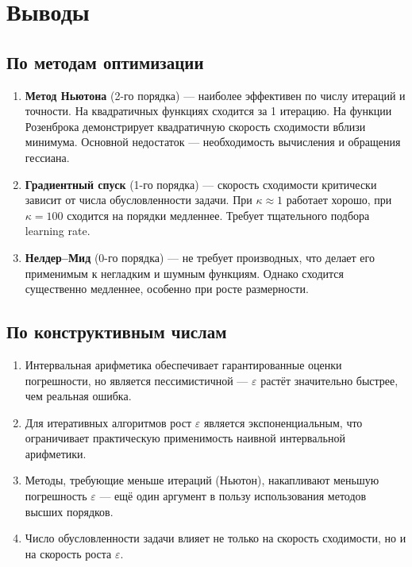 \documentclass[a4paper, 14pt]{extarticle}
\begin{document}
\section{Выводы}

\subsection{По методам оптимизации}

\begin{enumerate}
    \item \textbf{Метод Ньютона} (2-го порядка) --- наиболее эффективен по числу итераций и точности. На квадратичных функциях сходится за 1 итерацию. На функции Розенброка демонстрирует квадратичную скорость сходимости вблизи минимума. Основной недостаток --- необходимость вычисления и обращения гессиана.

    \item \textbf{Градиентный спуск} (1-го порядка) --- скорость сходимости критически зависит от числа обусловленности задачи. При $\kappa \approx 1$ работает хорошо, при $\kappa = 100$ сходится на порядки медленнее. Требует тщательного подбора learning rate.

    \item \textbf{Нелдер--Мид} (0-го порядка) --- не требует производных, что делает его применимым к негладким и шумным функциям. Однако сходится существенно медленнее, особенно при росте размерности.
\end{enumerate}

\subsection{По конструктивным числам}

\begin{enumerate}
    \item Интервальная арифметика обеспечивает гарантированные оценки погрешности, но является пессимистичной --- $\varepsilon$ растёт значительно быстрее, чем реальная ошибка.

    \item Для итеративных алгоритмов рост $\varepsilon$ является экспоненциальным, что ограничивает практическую применимость наивной интервальной арифметики.

    \item Методы, требующие меньше итераций (Ньютон), накапливают меньшую погрешность $\varepsilon$ --- ещё один аргумент в пользу использования методов высших порядков.

    \item Число обусловленности задачи влияет не только на скорость сходимости, но и на скорость роста $\varepsilon$.
\end{enumerate}
\end{document}
